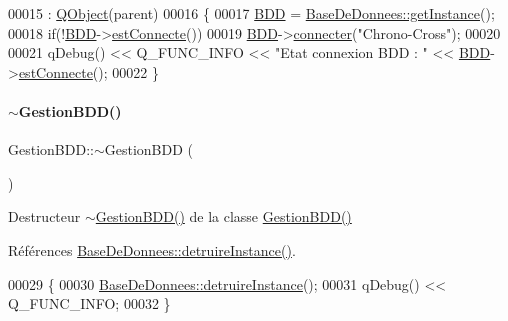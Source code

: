 \begin{DoxyCode}
00015                                       : \hyperlink{class_q_object}{QObject}(parent)
00016 \{
00017     \hyperlink{class_gestion_b_d_d_a1bd17cbf5754eb6e54ae351f1d02dca2}{BDD} = \hyperlink{class_base_de_donnees_a80028aa2b6b4fbf30fb2e36357b7d3d3}{BaseDeDonnees::getInstance}();
00018     \textcolor{keywordflow}{if}(!\hyperlink{class_gestion_b_d_d_a1bd17cbf5754eb6e54ae351f1d02dca2}{BDD}->\hyperlink{class_base_de_donnees_a00388973f3ec42e5c8e76e7af7e124b2}{estConnecte}())
00019         \hyperlink{class_gestion_b_d_d_a1bd17cbf5754eb6e54ae351f1d02dca2}{BDD}->\hyperlink{class_base_de_donnees_ab2e092285ccc0ee1cce61a1774218561}{connecter}(\textcolor{stringliteral}{"Chrono-Cross"});
00020 
00021     qDebug() << Q\_FUNC\_INFO << \textcolor{stringliteral}{"Etat connexion BDD : "} << \hyperlink{class_gestion_b_d_d_a1bd17cbf5754eb6e54ae351f1d02dca2}{BDD}->\hyperlink{class_base_de_donnees_a00388973f3ec42e5c8e76e7af7e124b2}{estConnecte}();
00022 \}
\end{DoxyCode}
\mbox{\label{class_gestion_b_d_d_a4d98c4008182a5749c57c97772b3c303}} 
\paragraph{\texorpdfstring{$\sim$\+Gestion\+B\+D\+D()}{~GestionBDD()}}
{\footnotesize\ttfamily Gestion\+B\+D\+D\+::$\sim$\+Gestion\+B\+DD (\begin{DoxyParamCaption}{ }\end{DoxyParamCaption})}



Destructeur \hyperlink{class_gestion_b_d_d_a4d98c4008182a5749c57c97772b3c303}{$\sim$\+Gestion\+B\+D\+D()} de la classe \hyperlink{class_gestion_b_d_d_a406bdb9b1714b204fa6fab015baffc27}{Gestion\+B\+D\+D()} 



Références \hyperlink{class_base_de_donnees_a457401c0816b888c77ce915997545f4e}{Base\+De\+Donnees\+::detruire\+Instance()}.


\begin{DoxyCode}
00029 \{
00030     \hyperlink{class_base_de_donnees_a457401c0816b888c77ce915997545f4e}{BaseDeDonnees::detruireInstance}();
00031     qDebug() << Q\_FUNC\_INFO;
00032 \}
\end{DoxyCode}


